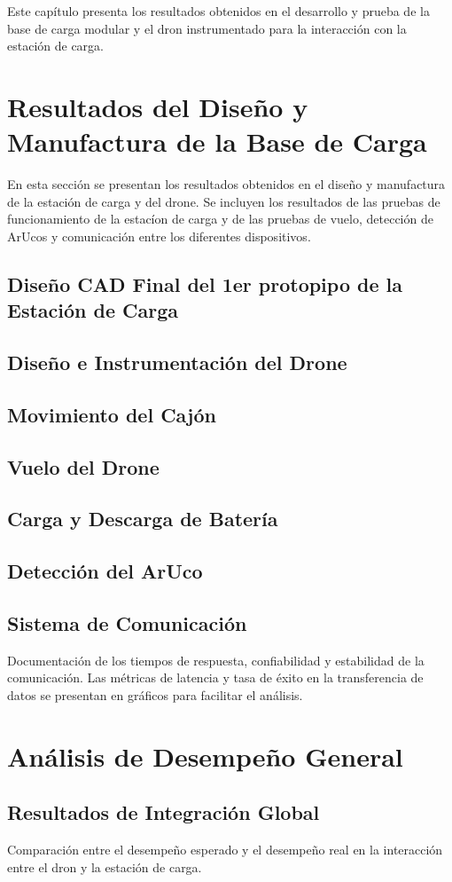 Este capítulo presenta los resultados obtenidos en el desarrollo y prueba de la base de carga modular y el dron instrumentado para la interacción con la estación de carga. 

\section{Resultados del Diseño y Manufactura de la Base de Carga}
En esta sección se presentan los resultados obtenidos en el diseño y manufactura de la estación de carga y del drone. Se incluyen los resultados de las pruebas de funcionamiento de la estacíon de carga y de las pruebas de vuelo, detección de ArUcos y comunicación entre los diferentes dispositivos.

\subsection{Diseño CAD Final del 1er protopipo de la Estación de Carga}


\subsection{Diseño e Instrumentación del Drone}

\subsection{Movimiento del Cajón}

\subsection{Vuelo del Drone}

\subsection{Carga y Descarga de Batería}

\subsection{Detección del ArUco}

\subsection{Sistema de Comunicación}
Documentación de los tiempos de respuesta, confiabilidad y estabilidad de la comunicación. Las métricas de latencia y tasa de éxito en la transferencia de datos se presentan en gráficos para facilitar el análisis.

\section{Análisis de Desempeño General}
\subsection{Resultados de Integración Global}
Comparación entre el desempeño esperado y el desempeño real en la interacción entre el dron y la estación de carga.
